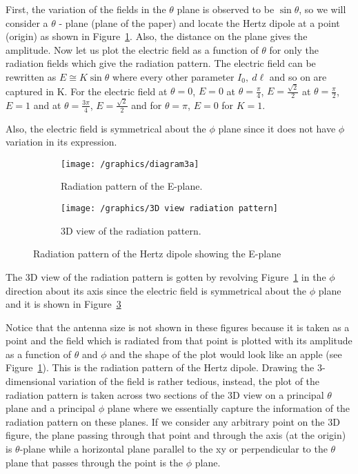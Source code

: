 First, the variation of the fields in the $\theta$ plane is observed to be $\sin\theta$, so we will consider a $\theta$ - plane (plane of the paper) and locate the Hertz dipole at a point (origin) as shown in Figure~\ref{fig:thetaplane}. Also, the distance on the plane gives the amplitude. Now let us plot the electric field as a function of $\theta$ for only the radiation fields which give the radiation pattern. The electric field can be rewritten as $E \cong K\sin\theta$ where every other parameter $I_0, \ d\ell$ and so on are captured in K. For the electric field at $\theta = 0$, $E=0$ at $\theta=\frac{\pi}{4}$, $E=\frac{\sqrt{2}}{2}$ at $\theta=\frac{\pi}{2}$, $E=1$ and at $\theta=\frac{3\pi}{4}$, $E=\frac{\sqrt{2}}{2}$ and for $\theta=\pi$, $E=0$ for $K=1$.

Also, the electric field is symmetrical about the $\phi$ plane since it does not have $\phi$ variation in its expression. 
\begin{figure}[h]
\centering
\begin{subfigure}[a]{0.8\linewidth}
\texttt{[image: /graphics/diagram3a]}
\caption{Radiation pattern of the E-plane.}
\label{fig:thetaplane}
\end{subfigure}
\hfill
\begin{subfigure}[b]{0.8\linewidth}
\texttt{[image: /graphics/3D view radiation pattern]}
\caption{3D view of the radiation pattern.}
\label{fig:3dview}
\end{subfigure}
\caption{Radiation pattern of the Hertz dipole showing the E-plane}
\end{figure}

The 3D view of the radiation pattern is gotten by revolving Figure~\ref{fig:thetaplane} in the $\phi$ direction about its axis since the electric field is symmetrical about the $\phi$ plane and it is shown in Figure~\ref{fig:3dview}

Notice that the antenna size is not shown in these figures because it is taken as a point and the field which is radiated from that point is plotted with its amplitude as a function of $\theta$ and $\phi$ and the shape of the plot would look like an apple (see Figure~\ref{fig:thetaplane}). This is the radiation pattern of the Hertz dipole. Drawing the 3-dimensional variation of the field is rather tedious, instead, the plot of the radiation pattern is taken across two sections of the 3D view on a principal $\theta$ plane and a principal $\phi$ plane where we essentially capture the information of the radiation pattern on these planes. If we consider any arbitrary point on the 3D figure, the plane passing through that point and through the axis (at the origin) is $\theta$-plane while a horizontal plane parallel to the xy or perpendicular to the $\theta$ plane that passes through the point is the $\phi$ plane.

